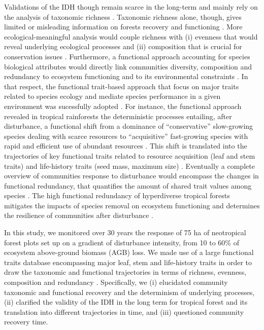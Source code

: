 \documentclass[fleqn,10pt]{ArtEcoFoG} %
\begin{document}
Validations of the IDH though remain scarce in the long-term and mainly
rely on the analysis of taxonomic richness \citep{Molino2001}. Taxonomic
richness alone, though, gives limited or misleading information on
forests recovery and functioning \citep{Martin2015, Chaudhary2016}. More
ecological-meaningful analysis would couple richness with (i) evenness
that would reveal underlying ecological processes and (ii) composition
that is crucial for conservation issues
\citep{Magurran1988, Lavorel2002, Bellwood2006}. Furthermore, a
functional approach accounting for species biological attributes would
directly link communities diversity, composition and redundancy to
ecosystem functioning and to its environmental constraints
\citep{Violle2007b, Moretti2009, Baraloto2012a, Scheiter2013}. In that
respect, the functional trait-based approach that focus on major traits
related to species ecology and mediate species performance in a given
environment was sucessfully adopted \citep{Diaz2005, Villeger2008a}. For
instance, the functional approach revealed in tropical rainforests the
deterministic processes entailing, after disturbance, a functional shift
from a dominance of ``conservative'' slow-growing species dealing with
scarce resources to ``acquisitive'' fast-growing species with rapid and
efficient use of abundant resources
\citep{TerSteege2001, Reich2014, Herault2011}. This shift is translated
into the trajectories of key functional traits related to resource
acquisition (leaf and stem traits) and life-history traits (seed mass,
maximum size)
\citep{Wright2004, TerSteege2006, Westoby2006a, Chave2009b}. Eventually
a complete overview of communities response to disturbance would
encompass the changes in functional redundancy, that quantifies the
amount of shared trait values among species \citep{Carmona2016}. The
high functional redundancy of hyperdiverse tropical forests
\citep{Bellwood2006} mitigates the impacts of species removal on
ecosystem functioning and determines the resilience of communities after
disturbance \citep{Trenbath1999, Elmqvist2003, Diaz2005}.

In this study, we monitored over 30 years the response of 75 ha of
neotropical forest plots set up on a gradient of disturbance intensity,
from 10 to 60\% of ecosystem above-ground biomass (AGB) loss. We made
use of a large functional traits database encompassing major leaf, stem
and life-history traits in order to draw the taxonomic and functional
trajectories in terms of richness, evenness, composition and redundancy
\citep{Lohbeck2015, Guariguata2001}. Specifically, we (i) elucidated
community taxonomic and functional recovery and the determinism of
underlying processes, (ii) clarified the validity of the IDH in the long
term for tropical forest and its translation into different trajectories
in time, and (iii) questioned community recovery time.
\end{document}

